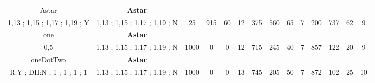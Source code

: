 \begin{table}[]
{\begin{tabular}{|c|c|c|c|c|c|c|c|c|c|c|c|c|c|}
Astar & \cellcolor{blue!15}\textbf{Astar}& {\color[HTML]{00009B} } & {\color[HTML]{9A0000} } & {\color[HTML]{009901} } &  & {\color[HTML]{00009B} } & {\color[HTML]{9A0000} } & {\color[HTML]{009901} } &  & {\color[HTML]{00009B} } & {\color[HTML]{9A0000} } & {\color[HTML]{009901} } &  \\ 
1,13 ; 1,15 ; 1,17 ; 1,19 ; Y & \cellcolor{ blue!15}1,13 ; 1,15 ; 1,17 ; 1,19 ; N & \multirow{-2}{*}{{\color[HTML]{00009B} 25}} & \multirow{-2}{*}{{\color[HTML]{9A0000} 915}} & \multirow{-2}{*}{{\color[HTML]{009901} 60}} & \multirow{-2}{*}{12} & \multirow{-2}{*}{{\color[HTML]{00009B} 375}} & \multirow{-2}{*}{{\color[HTML]{9A0000} 560}} & \multirow{-2}{*}{{\color[HTML]{009901} 65}} & \multirow{-2}{*}{7} & \multirow{-2}{*}{{\color[HTML]{00009B} 200}} & \multirow{-2}{*}{{\color[HTML]{9A0000} 737}} & \multirow{-2}{*}{{\color[HTML]{009901} 62}} & \multirow{-2}{*}{9} \\ \hline

one & \cellcolor{blue!15}\textbf{Astar}& {\color[HTML]{00009B} } & {\color[HTML]{9A0000} } & {\color[HTML]{009901} } &  & {\color[HTML]{00009B} } & {\color[HTML]{9A0000} } & {\color[HTML]{009901} } &  & {\color[HTML]{00009B} } & {\color[HTML]{9A0000} } & {\color[HTML]{009901} } &  \\ 
0,5 & \cellcolor{ blue!15}1,13 ; 1,15 ; 1,17 ; 1,19 ; N & \multirow{-2}{*}{{\color[HTML]{00009B} 1000}} & \multirow{-2}{*}{{\color[HTML]{9A0000} 0}} & \multirow{-2}{*}{{\color[HTML]{009901} 0}} & \multirow{-2}{*}{12} & \multirow{-2}{*}{{\color[HTML]{00009B} 715}} & \multirow{-2}{*}{{\color[HTML]{9A0000} 245}} & \multirow{-2}{*}{{\color[HTML]{009901} 40}} & \multirow{-2}{*}{7} & \multirow{-2}{*}{{\color[HTML]{00009B} 857}} & \multirow{-2}{*}{{\color[HTML]{9A0000} 122}} & \multirow{-2}{*}{{\color[HTML]{009901} 20}} & \multirow{-2}{*}{9} \\ \hline

oneDotTwo & \cellcolor{blue!15}\textbf{Astar}& {\color[HTML]{00009B} } & {\color[HTML]{9A0000} } & {\color[HTML]{009901} } &  & {\color[HTML]{00009B} } & {\color[HTML]{9A0000} } & {\color[HTML]{009901} } &  & {\color[HTML]{00009B} } & {\color[HTML]{9A0000} } & {\color[HTML]{009901} } &  \\ 
R:Y ; DH:N ; 1 ; 1 ; 1 ; 1 & \cellcolor{ blue!15}1,13 ; 1,15 ; 1,17 ; 1,19 ; N & \multirow{-2}{*}{{\color[HTML]{00009B} 1000}} & \multirow{-2}{*}{{\color[HTML]{9A0000} 0}} & \multirow{-2}{*}{{\color[HTML]{009901} 0}} & \multirow{-2}{*}{13} & \multirow{-2}{*}{{\color[HTML]{00009B} 745}} & \multirow{-2}{*}{{\color[HTML]{9A0000} 205}} & \multirow{-2}{*}{{\color[HTML]{009901} 50}} & \multirow{-2}{*}{7} & \multirow{-2}{*}{{\color[HTML]{00009B} 872}} & \multirow{-2}{*}{{\color[HTML]{9A0000} 102}} & \multirow{-2}{*}{{\color[HTML]{009901} 25}} & \multirow{-2}{*}{10} \\ \hline


\end{tabular}}
\end{table}
